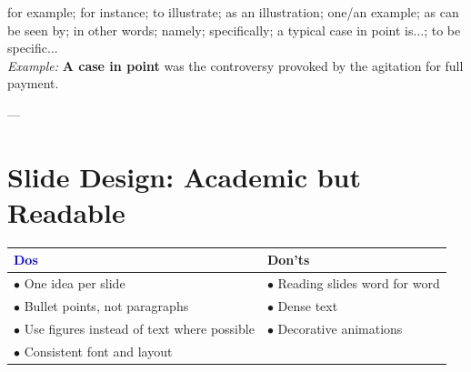 \documentclass[11pt, a4paper]{article}
\begin{document}
\begin{tcolorbox}[colback=red!5!white,colframe=red!75!black,title=To Give an Example]
for example; for instance; to illustrate; as an illustration; one/an example; as can be seen by; in other words; namely; specifically; a typical case in point is...; to be specific... \\
\textit{Example:} \textbf{A case in point} was the controversy provoked by the agitation for full payment.
\end{tcolorbox}

---

\section{Slide Design: Academic but Readable}

\begin{table}[h]
\centering
\begin{tabular}{|p{}|p{}|}
\hline
\textbf{\textcolor{blue}{Dos}} & \textbf{\textcolor{highlightred}{Don'ts}} \\ \hline
$\bullet$ One idea per slide & $\bullet$ Reading slides word for word \\
$\bullet$ Bullet points, not paragraphs & $\bullet$ Dense text \\
$\bullet$ Use figures instead of text where possible & $\bullet$ Decorative animations \\
$\bullet$ Consistent font and layout & \\ \hline
\end{tabular}
\end{table}
\end{document}
